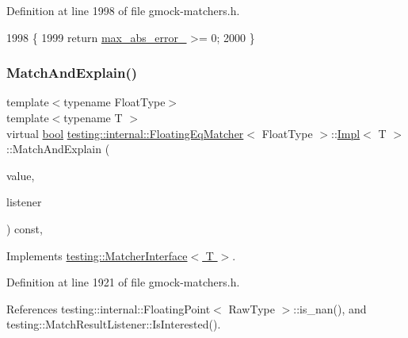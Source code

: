 Definition at line 1998 of file gmock-\/matchers.\+h.


\begin{DoxyCode}
1998                                 \{
1999       \textcolor{keywordflow}{return} \hyperlink{classtesting_1_1internal_1_1FloatingEqMatcher_1_1Impl_afec03a9fc571d9907979f088ff5e55e5}{max\_abs\_error\_} >= 0;
2000     \}
\end{DoxyCode}
\mbox{\label{classtesting_1_1internal_1_1FloatingEqMatcher_1_1Impl_a4ce47c481fdc4973ed671a492f455f99}} 
\subsubsection{\texorpdfstring{Match\+And\+Explain()}{MatchAndExplain()}}
{\footnotesize\ttfamily template$<$typename Float\+Type$>$ \\
template$<$typename T $>$ \\
virtual \hyperlink{classbool}{bool} \hyperlink{classtesting_1_1internal_1_1FloatingEqMatcher}{testing\+::internal\+::\+Floating\+Eq\+Matcher}$<$ Float\+Type $>$\+::\hyperlink{classtesting_1_1internal_1_1FloatingEqMatcher_1_1Impl}{Impl}$<$ T $>$\+::Match\+And\+Explain (\begin{DoxyParamCaption}\item[{T}]{value,  }\item[{\hyperlink{classtesting_1_1MatchResultListener}{Match\+Result\+Listener} $\ast$}]{listener }\end{DoxyParamCaption}) const\hspace{0.3cm}{\ttfamily [inline]}, {\ttfamily [virtual]}}



Implements \hyperlink{classtesting_1_1MatcherInterface_a296b43607cd99d60365f0e6a762777cf}{testing\+::\+Matcher\+Interface$<$ T $>$}.



Definition at line 1921 of file gmock-\/matchers.\+h.



References testing\+::internal\+::\+Floating\+Point$<$ Raw\+Type $>$\+::is\+\_\+nan(), and testing\+::\+Match\+Result\+Listener\+::\+Is\+Interested().



